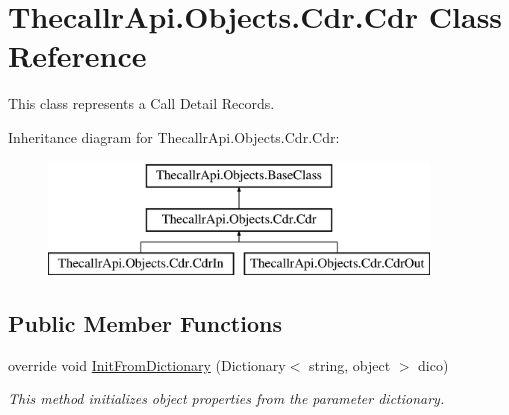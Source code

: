 \hypertarget{class_thecallr_api_1_1_objects_1_1_cdr_1_1_cdr}{\section{Thecallr\+Api.\+Objects.\+Cdr.\+Cdr Class Reference}
\label{class_thecallr_api_1_1_objects_1_1_cdr_1_1_cdr}
}


This class represents a Call Detail Records.  


Inheritance diagram for Thecallr\+Api.\+Objects.\+Cdr.\+Cdr\+:\begin{figure}[H]
\begin{center}
\leavevmode
\includegraphics[height=3.000000cm]{class_thecallr_api_1_1_objects_1_1_cdr_1_1_cdr}
\end{center}
\end{figure}
\subsection*{Public Member Functions}
\begin{DoxyCompactItemize}
\item 
override void \hyperlink{class_thecallr_api_1_1_objects_1_1_cdr_1_1_cdr_aace16753e6a3e13f8261c41a4b76a7b3}{Init\+From\+Dictionary} (Dictionary$<$ string, object $>$ dico)
\begin{DoxyCompactList}\small\item\em This method initializes object properties from the parameter dictionary. \end{DoxyCompactList}\end{DoxyCompactItemize}

